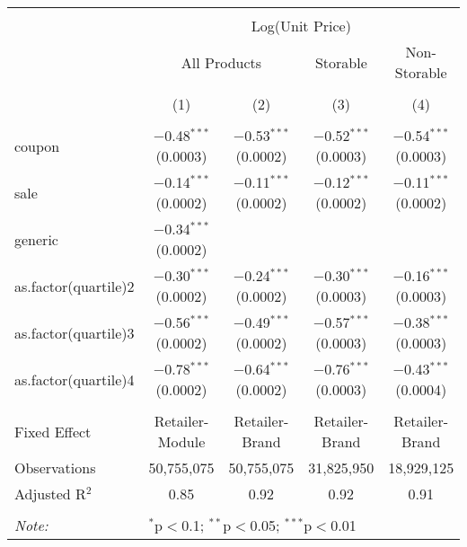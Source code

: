 
\begin{table}[!htbp] \centering 
  \caption{} 
  \label{tab:overallSavings} 
\begin{tabular}{@{\extracolsep{5pt}}lcccc} 
\\[-1.8ex]\hline 
\hline \\[-1.8ex] 
 & \multicolumn{4}{c}{Log(Unit Price)} \\ 
\cline{2-5} 
 & \multicolumn{2}{c}{All Products} & Storable & Non-Storable \\ 
\\[-1.8ex] & (1) & (2) & (3) & (4)\\ 
\hline \\[-1.8ex] 
 coupon & $-$0.48$^{***}$ (0.0003) & $-$0.53$^{***}$ (0.0002) & $-$0.52$^{***}$ (0.0003) & $-$0.54$^{***}$ (0.0003) \\ 
  sale & $-$0.14$^{***}$ (0.0002) & $-$0.11$^{***}$ (0.0002) & $-$0.12$^{***}$ (0.0002) & $-$0.11$^{***}$ (0.0002) \\ 
  generic & $-$0.34$^{***}$ (0.0002) &  &  &  \\ 
  as.factor(quartile)2 & $-$0.30$^{***}$ (0.0002) & $-$0.24$^{***}$ (0.0002) & $-$0.30$^{***}$ (0.0003) & $-$0.16$^{***}$ (0.0003) \\ 
  as.factor(quartile)3 & $-$0.56$^{***}$ (0.0002) & $-$0.49$^{***}$ (0.0002) & $-$0.57$^{***}$ (0.0003) & $-$0.38$^{***}$ (0.0003) \\ 
  as.factor(quartile)4 & $-$0.78$^{***}$ (0.0002) & $-$0.64$^{***}$ (0.0002) & $-$0.76$^{***}$ (0.0003) & $-$0.43$^{***}$ (0.0004) \\ 
 \hline \\[-1.8ex] 
Fixed Effect & Retailer-Module & Retailer-Brand & Retailer-Brand & Retailer-Brand \\ 
Observations & 50,755,075 & 50,755,075 & 31,825,950 & 18,929,125 \\ 
Adjusted R$^{2}$ & 0.85 & 0.92 & 0.92 & 0.91 \\ 
\hline 
\hline \\[-1.8ex] 
\textit{Note:}  & \multicolumn{4}{l}{$^{*}$p$<$0.1; $^{**}$p$<$0.05; $^{***}$p$<$0.01} \\ 
\end{tabular} 
\end{table} 
